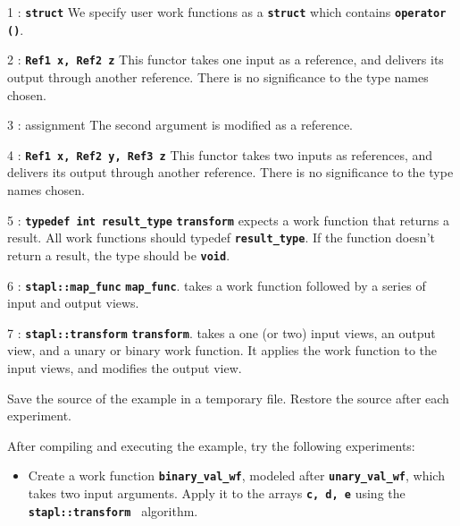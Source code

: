 \documentclass{report}
\begin{document}
\begin{hashitemize}

\item 1 : \texttt{{\bf struct}}
\newline
We specify user work functions as a
\texttt{{\bf struct}}
 which contains
\texttt{{\bf operator ()}}.

\item 2 : \texttt{{\bf Ref1 x, Ref2 z}}
\newline
This functor takes one input as a reference, and delivers its output
through another reference.  There is no significance to the type names
chosen.

\item 3 : assignment
\newline
The second argument is modified as a reference.

\item 4 : \texttt{{\bf Ref1 x, Ref2 y, Ref3 z}}
\newline
This functor takes two inputs as references, and delivers its output
through another reference.  There is no significance to the type names
chosen.

\item 5 : \texttt{{\bf typedef int result\_type}}
\newline
\texttt{{\bf transform}}
expects a work function that returns a result.
All work functions should typedef
\texttt{{\bf result\_type}}.
If the function doesn't return a result, the type should be
\texttt{{\bf void}}.

\item 6 : \texttt{{\bf stapl::map\_func}}
\newline
\texttt{{\bf map\_func}}.
takes a work function followed by a series of input and
output views.

\item 7 : \texttt{{\bf stapl::transform}}
\newline
\texttt{{\bf transform}}.
takes a one (or two) input views, an output view,
and a unary or binary work function.  It applies the work function
to the input views, and modifies the output view.

\end{hashitemize}

Save the source of the example in a temporary file.
Restore the source after each experiment.

After compiling and executing the example, try the following experiments:
\begin{itemize}
\item
Create a work function
\texttt{{\bf binary\_val\_wf}},
modeled after
\texttt{{\bf unary\_val\_wf}}, which takes two input arguments.
Apply it to the arrays
\texttt{{\bf c, d, e}} using the
\texttt{{\bf stapl::transform }} algorithm.
\end{itemize}
\end{document}
